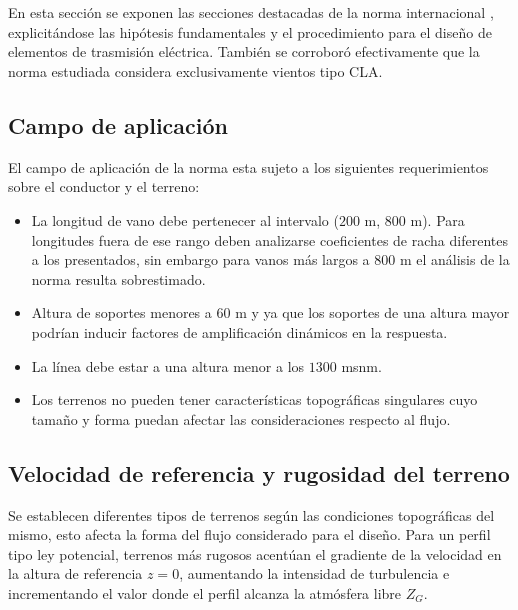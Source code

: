 \chapter{}\label{Ape2}

En esta sección se exponen las secciones destacadas de la norma internacional \cite{IEC60826}, explicitándose las hipótesis fundamentales y el procedimiento para el diseño de elementos de trasmisión eléctrica. También se corroboró efectivamente que la norma estudiada considera exclusivamente vientos tipo CLA.

\section{Campo de aplicación}
El campo de aplicación de la norma esta sujeto a los siguientes requerimientos sobre el conductor y el terreno:

\begin{itemize}
	\item La longitud de vano debe pertenecer al intervalo ($200$ m, $800$ m). Para longitudes fuera de ese rango deben analizarse coeficientes de racha diferentes a los presentados, sin embargo para vanos más largos a $800$ m el análisis de la norma resulta sobrestimado.
	\item Altura de soportes menores a $60$ m y ya que los soportes de una altura mayor podrían inducir factores de amplificación dinámicos en la respuesta.
	\item La línea debe estar a una altura menor a los $1300$ msnm.
	\item Los terrenos no pueden tener características topográficas singulares cuyo tamaño y forma puedan afectar las consideraciones respecto al flujo.
\end{itemize}

\section{Velocidad de referencia y rugosidad del terreno}
Se establecen diferentes tipos de terrenos según las condiciones topográficas del mismo, esto afecta la forma del flujo considerado para el diseño. Para un perfil tipo ley potencial, terrenos más rugosos acentúan el gradiente de la velocidad en la altura de referencia $z=0$,  aumentando la intensidad de turbulencia e incrementando el valor donde el perfil alcanza la atmósfera libre $Z_G$.

